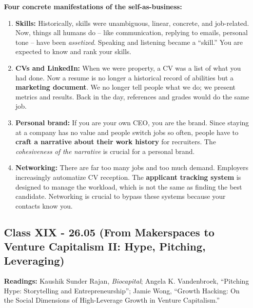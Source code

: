\documentclass[a4paper,12pt]{article}
\begin{document}
\noindent \textbf{Four concrete manifestations of the self-as-business:}
\begin{enumerate}
	\item \textbf{Skills:} Historically, skills were unambiguous, linear, concrete, and job-related. Now, things all humans do -- like communication, replying to emails, personal tone -- have been \emph{assetized}. Speaking and listening became a ``skill.'' You are expected to know and rank your skills.
	\item \textbf{CVs and LinkedIn:} When we were property, a CV was a list of what you had done. Now a resume is no longer a historical record of abilities but a \textbf{marketing document}. We no longer tell people what we do; we present metrics and results. Back in the day, references and grades would do the same job.
	\item \textbf{Personal brand:} If you are your own CEO, you are the brand. Since staying at a company has no value and people switch jobs so often, people have to \textbf{craft a narrative about their work history} for recruiters. The \emph{cohesiveness of the narrative} is crucial for a personal brand.
	\item \textbf{Networking:} There are far too many jobs and too much demand. Employers increasingly automatize CV reception. The \textbf{applicant tracking system} is designed to manage the workload, which is not the same as finding the best candidate. Networking is crucial to bypass these systems because your contacts know you.
\end{enumerate}

\subsection*{Class XIX - 26.05 (From Makerspaces to Venture Capitalism II: Hype, Pitching, Leveraging)}
\noindent \textbf{Readings:} Kaushik Sunder Rajan, \emph{Biocapital}; Angela K. Vandenbroek, ``Pitching Hype: Storytelling and Entrepreneurship''; Jamie Wong, ``Growth Hacking: On the Social Dimensions of High-Leverage Growth in Venture Capitalism.'' \\
\end{document}
